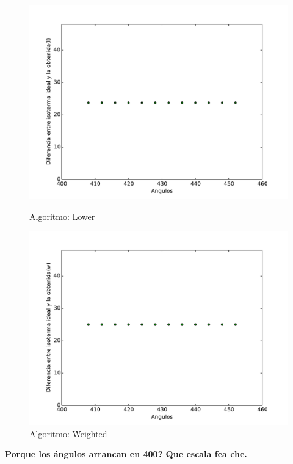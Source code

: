 \begin{figure}[h]
  \centering
  \begin{minipage}[b]{0.49\textwidth}
    \includegraphics[width=\textwidth]{graficos/nVariable_l.pdf}
    \caption{Algoritmo: Lower}
  \end{minipage}
  \hfill
  \begin{minipage}[b]{0.49\textwidth}
    \includegraphics[width=\textwidth]{graficos/nVariable_w.pdf}
    \caption{Algoritmo: Weighted}
  \end{minipage}
\end{figure}

\textbf{Porque los ángulos arrancan en 400? Que escala fea che.}


